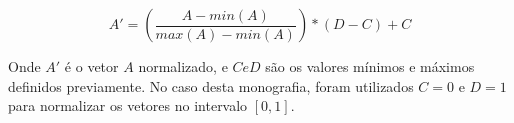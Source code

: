 $$
\label{eq:minmax}
A' = \left(\frac{A - min(A)}{max(A) - min(A)}\right) * (D - C) + C
$$

Onde $A'$ é o vetor $A$ normalizado, e $C e D$ são os valores mínimos e máximos definidos previamente. No caso desta monografia, foram utilizados $C = 0$ e $D = 1$ para normalizar os vetores no intervalo $[0, 1]$.






